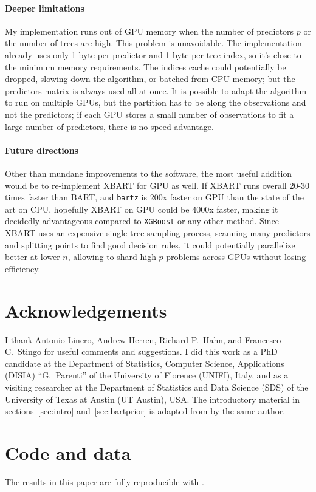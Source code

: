 \documentclass{article}
\begin{document}
    \paragraph{Deeper limitations}

    My implementation runs out of GPU memory when the number of predictors $p$ or the number of trees are high. This problem is unavoidable. The implementation already uses only 1 byte per predictor and 1 byte per tree index, so it's close to the minimum memory requirements. The indices cache could potentially be dropped, slowing down the algorithm, or batched from CPU memory; but the predictors matrix is always used all at once. It is possible to adapt the algorithm to run on multiple GPUs, but the partition has to be along the observations and not the predictors; if each GPU stores a small number of observations to fit a large number of predictors, there is no speed advantage.

    \paragraph{Future directions}

    Other than mundane improvements to the software, the most useful addition would be to re-implement XBART \autocite{he2021} for GPU as well. If XBART runs overall 20-30 times faster than BART, and \texttt{bartz} is 200x faster on GPU than the state of the art on CPU, hopefully XBART on GPU could be 4000x faster, making it decidedly advantageous compared to \texttt{XGBoost} or any other method. Since XBART uses an expensive single tree sampling process, scanning many predictors and splitting points to find good decision rules, it could potentially parallelize better at lower $n$, allowing to shard high-$p$ problems across GPUs without losing efficiency.

    \section*{Acknowledgements}

    I thank Antonio Linero, Andrew Herren, Richard P.\ Hahn, and Francesco C.\ Stingo for useful comments and suggestions. I did this work as a PhD candidate at the Department of Statistics, Computer Science, Applications (DISIA) ``G.~Parenti'' of the University of Florence (UNIFI), Italy, and as a visiting researcher at the Department of Statistics and Data Science (SDS) of the University of Texas at Austin (UT Austin), USA. The introductory material in sections~\ref{sec:intro} and~\ref{sec:bartprior} is adapted from \textcite{petrillo2024d} by the same author.

    \section*{Code and data}

    The results in this paper are fully reproducible with \textcite{petrillo2024e}.

    \printbibliography
\end{document}
